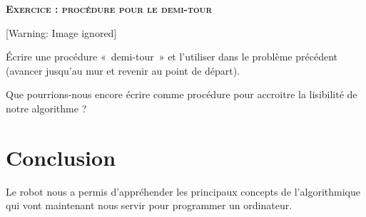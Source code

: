 









\bigskip


\bigskip


\bigskip

{\sffamily\bfseries\scshape
Exercice : procédure pour le demi-tour}

\begin{center}
 [Warning: Image ignored] %

\end{center}
{
Écrire une procédure «~demi-tour~» et l'utiliser dans
le problème précédent (avancer jusqu'au mur et revenir
au point de départ).}

{
Que pourrions-nous encore écrire comme procédure pour accroitre la
lisibilité de notre algorithme ?}

\section{Conclusion}
{
Le robot nous a permis d'appréhender les principaux
concepts de l'algorithmique qui vont maintenant nous
servir pour programmer un ordinateur. }

